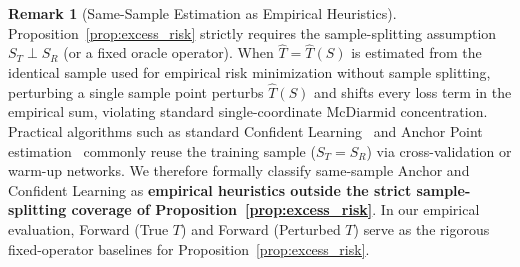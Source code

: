 \documentclass[10pt,twocolumn]{article}
\theoremstyle{definition}
\newtheorem{remark}{Remark}
\begin{document}
\begin{remark}[Same-Sample Estimation as Empirical Heuristics]
\label{rem:same_sample}
Proposition~\ref{prop:excess_risk} strictly requires the sample-splitting assumption $S_T \perp S_R$ (or a fixed oracle operator). When $\hat{T} = \hat{T}(S)$ is estimated from the identical sample used for empirical risk minimization without sample splitting, perturbing a single sample point perturbs $\hat{T}(S)$ and shifts every loss term in the empirical sum, violating standard single-coordinate McDiarmid concentration. Practical algorithms such as standard Confident Learning~\cite{northcutt2021confident} and Anchor Point estimation~\cite{patrini2017making} commonly reuse the training sample ($S_T = S_R$) via cross-validation or warm-up networks. We therefore formally classify same-sample Anchor and Confident Learning as \textbf{empirical heuristics outside the strict sample-splitting coverage of Proposition~\ref{prop:excess_risk}}. In our empirical evaluation, Forward (True $T$) and Forward (Perturbed $T$) serve as the rigorous fixed-operator baselines for Proposition~\ref{prop:excess_risk}.
\end{remark}
\end{document}

